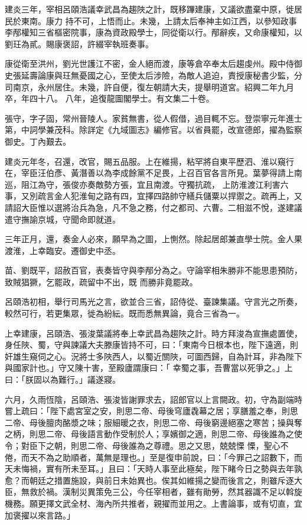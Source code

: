 \begin{pinyinscope}
 建炎三年，宰相呂頤浩議幸武昌為趨陜之計，既移蹕建康，又議欲盡棄中原，徙居民於東南。康力
 持不可，上悟而止。未幾，上請太后奉神主如江西，以參知政事李邴權知三省樞密院事，康為資政殿學士，同從衛以行。邴辭疾，又命康權知，以劉玨為貳。賜康褒詔，許綴宰執班奏事。



 康從衛至洪州，劉光世護江不密，金人絕而渡，康等倉卒奉太后趨虔州。殿中侍御史張延壽論康與玨無憂國之心，至使太后涉險，為敵人追迫，責授康秘書少監，分司南京，永州居住。未幾，許自便，復左朝請大夫，提舉明道宮。紹興二年九月卒，年四十八。
 八年，追復龍圖閣學士。有文集二十卷。



 張守，字子固，常州晉陵人。家貧無書，從人假借，過目輒不忘。登崇寧元年進士第，中詞學兼茂科。除詳定《九域圖志》編修官。以省員罷，改宣德郎，擢為監察御史。丁內艱去。



 建炎元年冬，召還，改官，賜五品服。上在維揚，粘罕將自東平歷泗、淮以窺行在，宰臣汪伯彥、黃潛善以為李成餘黨不足畏，上召百官各言所見。葉夢得請上南巡，阻江為守，張俊亦奏敵勢方張，宜且南渡。守獨抗疏，
 上防淮渡江利害六事，又別疏言金人犯淮甸之路有四，宜擇四路帥守繕兵儲粟以捍禦之。疏再上，又請詔大臣惟以選將治兵為急，凡不急之務，付之都司、六曹。二相滋不悅，遂建議遣守撫諭京城，守聞命即就道。



 三年正月，還，奏金人必來，願早為之圖，上惻然。除起居郎兼直學士院。金人果渡淮，上幸臨安。遷御史中丞。



 苗、劉既平，詔赦百官，表奏皆守與李邴分為之。守論宰相朱勝非不能思患預防，致賊猖獗，乞罷政，疏留中不出，既
 而勝非竟罷政。



 呂頤浩初相，舉行司馬光之言，欲並合三省，詔侍從、臺諫集議。守言光之所奏，較然可行，若更集眾，徙為紛紜。既而悉無異論，竟合三省為一。



 上幸建康，呂頤浩、張浚葉議將奉上幸武昌為趨陜之計。時方拜浚為宣撫處置使，身任陜、蜀，守與諫議大夫滕康皆持不可，曰：「東南今日根本也，陛下遠適，則奸雄生窺伺之心。況將士多陜西人，以蜀近關陜，可圖西歸，自為計耳，非為陛下與國家計也。」守又陳十害，至殿廬謂康曰：「
 幸蜀之事，吾曹當以死爭之。」上曰：「朕固以為難行。」議遂寢。



 六月，久雨恆陰，呂頤浩、張浚皆謝罪求去，詔郎官以上言闕政。初，守為副端時嘗上疏曰：「陛下處宮室之安，則思二帝、母後穹廬毳幕之居；享膳羞之奉，則思二帝、母後膻肉酪漿之味；服細暖之衣，則思二帝、母後窮邊絕塞之寒苦；操與奪之柄，則思二帝、母後語言動作受制於人；享嬪御之適，則思二帝、母後誰為之使令；對臣下之朝，則思二帝、母後誰為之尊禮。思之又思，兢兢慄
 慄，聖心不倦，而天不為之助順者，萬無是理也。」至是復申前說，曰：「今罪己之詔數下，而天未悔禍，實有所未至耳。」且曰：「天時人事至此極矣，陛下睹今日之勢與去年孰愈？而朝廷之措置施設，與前日未始異也。俟其如維揚之變而後言之，則雖斥逐大臣，無救於禍。漢制災異策免三公，今任宰相者，雖有勛勞，然其器識不足以斡旋機務。願更擇文武全材、海內所共推者，親擢而並用之。上書論事，或有切直，宜加褒擢以來言路。」




\end{pinyinscope}

